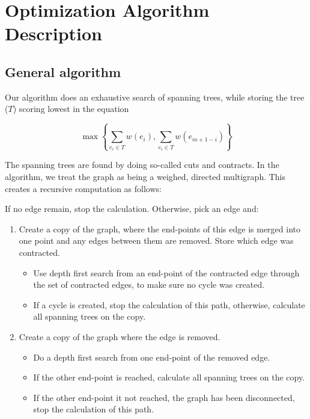 
\section{Optimization Algorithm Description}

\subsection{General algorithm}
Our algorithm does an exhaustive search of spanning trees, while storing the tree ($T$) scoring lowest in the equation

$$
\max \left\{ \sum_{e_i \in T} w(e_i), \sum_{e_i \in T} w(e_{m+1-i}) \right\}
$$

The spanning trees are found by doing so-called cuts and contracts. In the algorithm, we treat the graph as being a weighed, directed multigraph. This creates a recursive computation as follows:

\vspace{0.5cm}
\noindent
If no edge remain, stop the calculation. Otherwise, pick an edge and:

\begin{enumerate}
\item Create a copy of the graph, where the end-points of this edge is merged into one point and any edges between them are removed. Store which edge was contracted.

\begin{itemize}
\item Use depth first search from an end-point of the contracted edge through the set of contracted edges, to make sure no cycle was created. 

\item If a cycle is created, stop the calculation of this path, otherwise, calculate all spanning trees on the copy.
\end{itemize}

\item Create a copy of the graph where the edge is removed.
\begin{itemize}
\item Do a depth first search from one end-point of the removed edge.

\item If the other end-point is reached, calculate all spanning trees on the copy.

\item If the other end-point it not reached, the graph has been disconnected, stop the calculation of this path.
\end{itemize}
\end{enumerate} 

